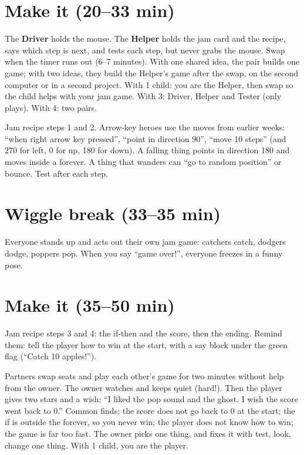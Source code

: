 \section{Make it (20--33 min)}
\begin{pairroles}
The \textbf{Driver} holds the mouse. The \textbf{Helper} holds the jam card and the recipe, says which step is next, and tests each step, but never grabs the mouse. Swap when the timer runs out (6--7 minutes). With one shared idea, the pair builds one game; with two ideas, they build the Helper's game after the swap, on the second computer or in a second project. With 1 child: you are the Helper, then swap so the child helps with your jam game. With 3: Driver, Helper and Tester (only plays). With 4: two pairs.
\end{pairroles}

Jam recipe steps 1 and 2. Arrow-key heroes use the moves from earlier weeks: \enquote{when right arrow key pressed}, \enquote{point in direction 90}, \enquote{move 10 steps} (and 270 for left, 0 for up, 180 for down). A falling thing points in direction 180 and moves inside a forever. A thing that wanders can \enquote{go to random position} or bounce. Test after each step.

\section{Wiggle break (33--35 min)}
Everyone stands up and acts out their own jam game: catchers catch, dodgers dodge, poppers pop. When you say \enquote{game over!}, everyone freezes in a funny pose.

\section{Make it (35--50 min)}
Jam recipe steps 3 and 4: the if-then and the score, then the ending. Remind them: tell the player how to win at the start, with a say block under the green flag (\enquote{Catch 10 apples!}).

\begin{bughunt}
Partners swap seats and play each other's game for two minutes without help from the owner. The owner watches and keeps quiet (hard!). Then the player gives two stars and a wish: \enquote{I liked the pop sound and the ghost. I wish the score went back to 0.} Common finds: the score does not go back to 0 at the start; the if is outside the forever, so you never win; the player does not know how to win; the game is far too fast. The owner picks one thing, and fixes it with test, look, change one thing. With 1 child, you are the player.
\end{bughunt}

